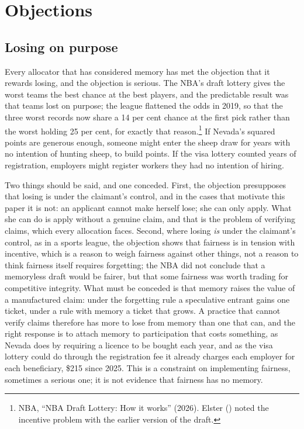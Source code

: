 \documentclass[
  11pt,
  letterpaper,
  DIV=11,
  numbers=noendperiod,
  twoside]{scrartcl}
\begin{document}
\section{Objections}\label{sec-objections}

\subsection{Losing on purpose}\label{losing-on-purpose}

Every allocator that has considered memory has met the objection that it
rewards losing, and the objection is serious. The NBA's draft lottery
gives the worst teams the best chance at the best players, and the
predictable result was that teams lost on purpose; the league flattened
the odds in 2019, so that the three worst records now share a 14 per
cent chance at the first pick rather than the worst holding 25 per cent,
for exactly that reason.\footnote{NBA, ``NBA Draft Lottery: How it
  works'' (2026). Elster () noted the
  incentive problem with the earlier version of the draft.} If Nevada's
squared points are generous enough, someone might enter the sheep draw
for years with no intention of hunting sheep, to build points. If the
visa lottery counted years of registration, employers might register
workers they had no intention of hiring.

Two things should be said, and one conceded. First, the objection
presupposes that losing is under the claimant's control, and in the
cases that motivate this paper it is not: an applicant cannot make
herself lose; she can only apply. What she can do is apply without a
genuine claim, and that is the problem of verifying claims, which every
allocation faces. Second, where losing \emph{is} under the claimant's
control, as in a sports league, the objection shows that fairness is in
tension with incentive, which is a reason to weigh fairness against
other things, not a reason to think fairness itself requires forgetting;
the NBA did not conclude that a memoryless draft would be fairer, but
that some fairness was worth trading for competitive integrity. What
must be conceded is that memory raises the value of a manufactured
claim: under the forgetting rule a speculative entrant gains one ticket,
under a rule with memory a ticket that grows. A practice that cannot
verify claims therefore has more to lose from memory than one that can,
and the right response is to attach memory to participation that costs
something, as Nevada does by requiring a licence to be bought each year,
and as the visa lottery could do through the registration fee it already
charges each employer for each beneficiary, \$215 since 2025. This is a
constraint on implementing fairness, sometimes a serious one; it is not
evidence that fairness has no memory.
\end{document}
